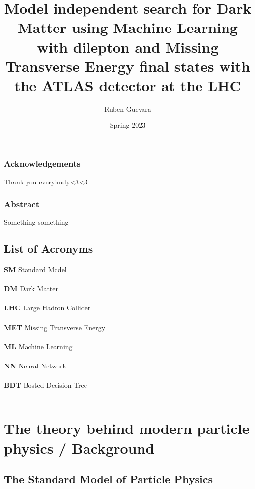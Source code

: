 \documentclass[14pt, a4paper]{book}
\title{Model independent search for Dark Matter using Machine Learning 
with dilepton and Missing Transverse Energy final states with the ATLAS detector at the LHC 
}
\author{Ruben Guevara}
\date{Spring 2023}
\begin{document}


\uiomasterfp[
colour = pink,
dept = {Department of Physics},
long,
program = {Physics: Nuclear and Particle Physics},
supervisors = {Professor Farid Ould-Saada \and Dr. Eirik Gramstad}
]
\newpage
\section*{Acknowledgements}
Thank you everybody<3<3

\newpage
\begin{center}
\section*{Abstract}
Something something
\end{center}


\newpage
\tableofcontents
\listoffigures
\listoftables

\chapter*{List of Acronyms}
\textbf{SM} Standard Model\\\\
\textbf{DM} Dark Matter\\\\
\textbf{LHC} Large Hadron Collider\\\\
\textbf{MET} Missing Transverse Energy\\\\
\textbf{ML} Machine Learning\\\\
\textbf{NN} Neural Network\\\\
\textbf{BDT} Bosted Decision Tree\\\\
\newpage
{}


\part{The theory behind modern particle physics / Background}


\chapter{The Standard Model of Particle Physics}

\end{document}
